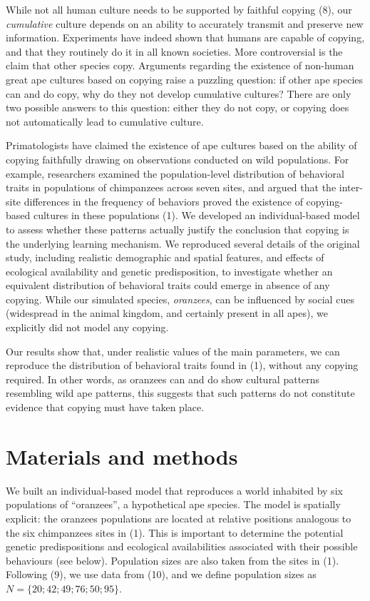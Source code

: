 \documentclass[9pt,twocolumn,twoside,]{pnas-new}
\begin{document}
While not all human culture needs to be supported by faithful copying
(8), our \emph{cumulative} culture depends on an ability to accurately
transmit and preserve new information. Experiments have indeed shown
that humans are capable of copying, and that they routinely do it in all
known societies. More controversial is the claim that other species
copy. Arguments regarding the existence of non-human great ape cultures
based on copying raise a puzzling question: if other ape species can and
do copy, why do they not develop cumulative cultures? There are only two
possible answers to this question: either they do not copy, or copying
does not automatically lead to cumulative culture.

Primatologists have claimed the existence of ape cultures based on the
ability of copying faithfully drawing on observations conducted on wild
populations. For example, researchers examined the population-level
distribution of behavioral traits in populations of chimpanzees across
seven sites, and argued that the inter-site differences in the frequency
of behaviors proved the existence of copying-based cultures in these
populations (1). We developed an individual-based model to assess
whether these patterns actually justify the conclusion that copying is
the underlying learning mechanism. We reproduced several details of the
original study, including realistic demographic and spatial features,
and effects of ecological availability and genetic predisposition, to
investigate whether an equivalent distribution of behavioral traits
could emerge in absence of any copying. While our simulated species,
\emph{oranzees}, can be influenced by social cues (widespread in the
animal kingdom, and certainly present in all apes), we explicitly did
not model any copying.

Our results show that, under realistic values of the main parameters, we
can reproduce the distribution of behavioral traits found in (1),
without any copying required. In other words, as oranzees can and do
show cultural patterns resembling wild ape patterns, this suggests that
such patterns do not constitute evidence that copying must have taken
place.

\section*{Materials and methods}\label{materials-and-methods}

We built an individual-based model that reproduces a world inhabited by
six populations of ``oranzees'', a hypothetical ape species. The model
is spatially explicit: the oranzees populations are located at relative
positions analogous to the six chimpanzees sites in (1). This is
important to determine the potential genetic predispositions and
ecological availabilities associated with their possible behaviours (see
below). Population sizes are also taken from the sites in (1). Following
(9), we use data from (10), and we define population sizes as
\(N=\{20;42;49;76;50;95\}\).
\end{document}
